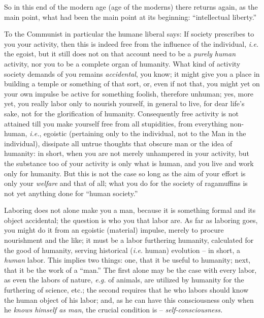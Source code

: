 \documentclass[12pt,a4paper]{book}
\begin{document}
So in this end of the modern age (age of the moderns) there returns again, as 
the main point, what had been the main point at its beginning: ``intellectual 
liberty.''

To the Communist in particular the humane liberal says: If society prescribes 
to you your activity, then this is indeed free from the influence of the 
individual, \textit{i.e.} the egoist, but it still does not on that account 
need to be a \textit{purely human} activity, nor you to be a complete organ of 
humanity. What kind of activity society demands of you remains 
\textit{accidental}, you know; it might give you a place in building a temple 
or something of that sort, or, even if not that, you might yet on your own 
impulse be active for something foolish, therefore unhuman; yes, more yet, you 
really labor only to nourish yourself, in general to live, for dear life's 
sake, not for the glorification of humanity. Consequently free activity is not 
attained till you make yourself free from all stupidities, from everything 
non-human, \textit{i.e.}, egoistic (pertaining only to the individual, not to 
the Man in the individual), dissipate all untrue thoughts that obscure man or 
the idea of humanity: in short, when you are not merely unhampered in your 
activity, but the substance too of your activity is only what is human, and 
you live and work only for humanity. But this is not the case so long as the 
aim of your effort is only your \textit{welfare} and that of all; what you do 
for the society of ragamuffins is not yet anything done for ``human 
society.''

Laboring does not alone make you a man, because it is something formal and its 
object accidental; the question is who you that labor are. As far as laboring 
goes, you might do it from an egoistic (material) impulse, merely to procure 
nourishment and the like; it must be a labor furthering humanity, calculated 
for the good of humanity, serving historical (\textit{i.e.} human) evolution 
-- in short, a \textit{human} labor. This implies two things: one, that it be 
useful to humanity; next, that it be the work of a ``man.'' The first alone 
may be the case with every labor, as even the labors of nature, \textit{e.g.} 
of animals, are utilized by humanity for the furthering of science, etc.; the 
second requires that he who labors should know the human object of his labor; 
and, as he can have this consciousness only when he \textit{knows himself as 
man}, the crucial condition is -- \textit{self-consciousness.}
\end{document}
